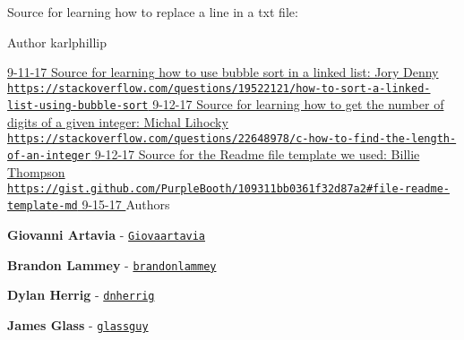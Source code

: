 Source for learning how to replace a line in a txt file\+:
\begin{DoxyItemize}
\item \begin{DoxyAuthor}{Author}
karlphillip
\end{DoxyAuthor}

\item \hyperlink{}{9-\/11-\/17 Source for learning how to use bubble sort in a linked list\+: Jory Denny \href{https://stackoverflow.com/questions/19522121/how-to-sort-a-linked-list-using-bubble-sort}{\tt https\+://stackoverflow.\+com/questions/19522121/how-\/to-\/sort-\/a-\/linked-\/list-\/using-\/bubble-\/sort} 9-\/12-\/17 Source for learning how to get the number of digits of a given integer\+: Michal Lihocky \href{https://stackoverflow.com/questions/22648978/c-how-to-find-the-length-of-an-integer}{\tt https\+://stackoverflow.\+com/questions/22648978/c-\/how-\/to-\/find-\/the-\/length-\/of-\/an-\/integer} 9-\/12-\/17 Source for the Readme file template we used\+: Billie Thompson \href{https://gist.github.com/PurpleBooth/109311bb0361f32d87a2#file-readme-template-md}{\tt https\+://gist.\+github.\+com/\+Purple\+Booth/109311bb0361f32d87a2\#file-\/readme-\/template-\/md} 9-\/15-\/17 }Authors
\item {\bfseries Giovanni Artavia} -\/ \href{https://github.com/Giovaartavia}{\tt Giovaartavia}
\item {\bfseries Brandon Lammey} -\/ \href{https://github.com/brandonlammey}{\tt brandonlammey}
\item {\bfseries Dylan Herrig} -\/ \href{https://github.com/dnherrig}{\tt dnherrig}
\item {\bfseries James Glass} -\/ \href{https://github.com/glassguy}{\tt glassguy} 
\end{DoxyItemize}